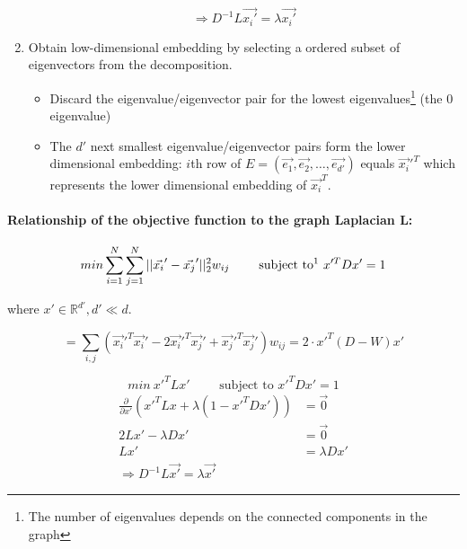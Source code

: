 \begin{enumerate}
      \[\Rightarrow \boxed{D^{-1} L \vec{x_i'} = \lambda \vec{x_i'}}\]

    \item Obtain low-dimensional embedding by selecting a ordered subset of eigenvectors from the decomposition.
    \begin{itemize}
        \item Discard the eigenvalue/eigenvector pair for the lowest eigenvalues\footnote{The number of eigenvalues depends on the connected components in the graph} (the 0 eigenvalue)
        \item The \(d'\) next smallest eigenvalue/eigenvector pairs form the lower dimensional embedding: \(i\)th row of \(E = (\vec{e_1}, \vec{e_2}, \dots, \vec{e_{d'}})\) equals  \(\vec{x_i}'^T\) which represents the lower dimensional embedding of \(\vec{x_i}^T\).
    \end{itemize}
\end{enumerate}

\paragraph{Relationship of the objective function to the graph Laplacian L:}
\[min \sum_{i=1}^{N}\sum_{j=1}^{N}||\vec{x_i}'- \vec{x_j}'||_2^2 w_{ij} \qquad \text{ subject to\footnote{squared distances should add up to 1} } x'^T D x' = 1 \]

where $ x'\in \mathbb{R}^{d'}, d' \ll d$.

\begin{equation*}
    = \sum_{i,j} (\vec{x_i}'^T \vec{x_i}' - 2 \vec{x_i}'^T \vec{x_j}' + \vec{x_j}'^T \vec{x_j}') w_{ij} = 2 \cdot x'^T (D-W) x'
\end{equation*}

\[min \ x'^T L x' \qquad \text{ subject to } x'^T D x' = 1\]
\begin{align*}
    \frac{\partial}{\partial x'} (x'^T L x + \lambda (1-x'^T D x')) &= \vec{0}\\
     2 L x' - \lambda D x' &= \vec{0}\\
    Lx' &= \lambda D x'\\
    \Rightarrow \boxed{D^{-1} L \vec{x'} = \lambda \vec{x'}}
\end{align*}
